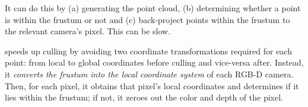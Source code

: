 It can do this by (a) generating the point cloud, (b) determining whether a point is within the frustum or not and (c) back-project points within the frustum to the relevant camera's pixel.
%
This can be slow.



\livo speeds up culling by avoiding two coordinate transformations required for each point: from local to global coordinates before culling and vice-versa after.
%
Instead, it \textit{converts the frustum into the local coordinate system} of each RGB-D camera.
%
Then, for each pixel, it obtains that pixel's local coordinates and determines if it lies within the frustum; if not, it zeroes out the color and depth of the pixel.
%




